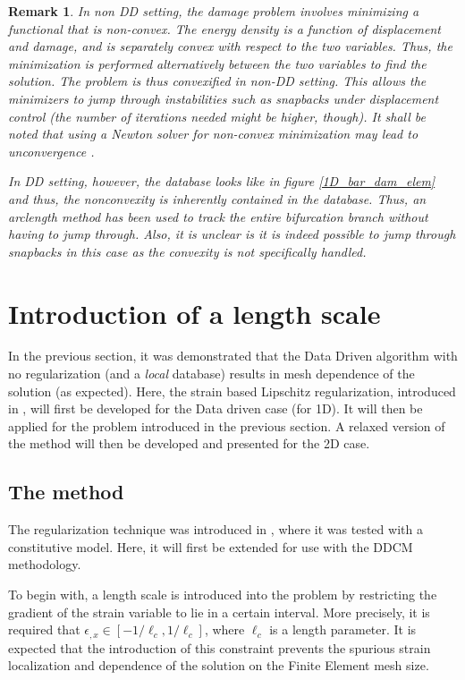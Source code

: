 \documentclass[11pt]{elsarticle}
\newtheorem*{remark}{Remark}
\begin{document}
\begin{remark}
	In non DD setting, the damage problem involves minimizing a functional that is non-convex. The energy density is a function of displacement and damage, and is separately convex with respect to the two variables. Thus, the minimization is performed alternatively between the two variables to find the solution. The problem is thus \textit{convexified} in non-DD setting. This allows the minimizers to \textit{jump through} instabilities such as snapbacks under displacement control (the number of iterations needed might be higher, though). It shall be noted that using a Newton solver for non-convex minimization may lead to unconvergence \cite{Farrell2017,Gerasimov2016}.
	
	In DD setting, however, the database looks like in figure \ref{1D_bar_dam_elem} and thus, the nonconvexity is inherently contained in the database. Thus, an arclength method has been used to track the entire bifurcation branch without having to jump through. Also, it is unclear is it is indeed possible to jump through snapbacks in this case as the convexity is not specifically handled. 
\end{remark}

\section{Introduction of a length scale}

In the previous section, it was demonstrated that the Data Driven algorithm with no regularization (and a \textit{local} database) results in mesh dependence of the solution (as expected). Here, the strain based Lipschitz regularization, introduced in \cite{Kamasamudram2023}, will first be developed for the Data driven case (for 1D). It will then be applied for the problem introduced in the previous section. A relaxed version of the method will then be developed and presented for the 2D case.

\subsection{The method}
The regularization technique was introduced in \cite{Kamasamudram2023}, where it was tested with a constitutive model. Here, it will first be extended for use with the DDCM methodology.

To begin with, a length scale is introduced into the problem by restricting the gradient of the strain variable to lie in a certain interval. More precisely, it is required that $\epsilon_{,x} \in [-1/{\ell_c}, 1/{\ell_c} ]$, where $\ell_c$ is a length parameter. It is expected that the introduction of this constraint prevents the spurious strain localization and dependence of the solution on the Finite Element mesh size. 
\end{document}
